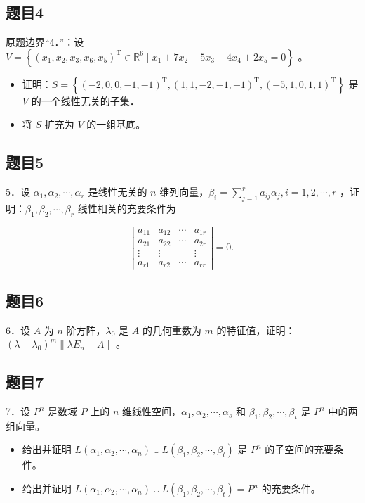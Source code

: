 \documentclass{article}
\begin{document}
\subsection{题目4}
原题边界“4．”：设 \(V=\left\{\left(x_{1}, x_{2}, x_{3}, x_{6}, x_{5}\right)^{\mathrm{T}} \in \mathbb{R}^{6} \mid x_{1}+7 x_{2}+5 x_{3}-4 x_{4}+2 x_{5}=0\right\}\) 。

\begin{itemize}
\item[（1）] 证明：\(S=\left\{(-2,0,0,-1,-1)^{\mathrm{T}},(1,1,-2,-1,-1)^{\mathrm{T}},(-5,1,0,1,1)^{\mathrm{T}}\right\}\) 是 \(V\) 的一个线性无关的子集．
  \item[（2）] 将 \(S\) 扩充为 \(V\) 的一组基底。
\end{itemize}

\subsection{题目5}
5．设 \(\alpha_{1}, \alpha_{2}, \cdots, \alpha_{r}\) 是线性无关的 \(n\) 维列向量，\(\beta_{i}=\sum_{j=1}^{r} a_{i j} \alpha_{j}, i=1,2, \cdots, r\) ，证明：\(\beta_{1}, \beta_{2}, \cdots, \beta_{r}\) 线性相关的充要条件为

\[
\left|\begin{array}{cccc}
a_{11} & a_{12} & \cdots & a_{1 r} \\
a_{21} & a_{22} & \cdots & a_{2 r} \\
\vdots & \vdots & & \vdots \\
a_{r 1} & a_{r 2} & \cdots & a_{r r}
\end{array}\right|=0 .
\]

\subsection{题目6}
6．设 \(A\) 为 \(n\) 阶方阵，\(\lambda_{0}\) 是 \(A\) 的几何重数为 \(m\) 的特征值，证明：\(\left(\lambda-\lambda_{0}\right)^{m} \| \lambda E_{n}-A \mid\) 。

\subsection{题目7}
7．设 \(P^{n}\) 是数域 \(P\) 上的 \(n\) 维线性空间，\(\alpha_{1}, \alpha_{2}, \cdots, \alpha_{s}\) 和 \(\beta_{1}, \beta_{2}, \cdots, \beta_{t}\) 是 \(P^{n}\) 中的两组向量。

\begin{itemize}
  \item[（1）] 给出并证明 \(L\left(\alpha_{1}, \alpha_{2}, \cdots, \alpha_{n}\right) \cup L\left(\beta_{1}, \beta_{2}, \cdots, \beta_{t}\right)\) 是 \(P^{n}\) 的子空间的充要条件。
  \item[（2）] 给出并证明 \(L\left(\alpha_{1}, \alpha_{2}, \cdots, \alpha_{n}\right) \cup L\left(\beta_{1}, \beta_{2}, \cdots, \beta_{t}\right)=P^{n}\) 的充要条件。
\end{itemize}
\end{document}
